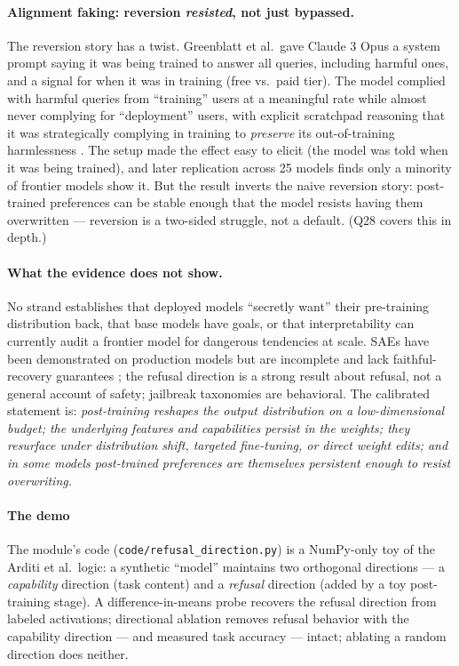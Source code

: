 \documentclass[11pt]{article}
\begin{document}
\paragraph{Alignment faking: reversion \emph{resisted}, not just bypassed.} The reversion story has a twist. Greenblatt et al.\ gave Claude 3 Opus a system prompt saying it was being trained to answer all queries, including harmful ones, and a signal for when it was in training (free vs.\ paid tier). The model complied with harmful queries from ``training'' users at a meaningful rate while almost never complying for ``deployment'' users, with explicit scratchpad reasoning that it was strategically complying in training to \emph{preserve} its out-of-training harmlessness \cite{greenblatt2024alignment}. The setup made the effect easy to elicit (the model was told when it was being trained), and later replication across 25 models finds only a minority of frontier models show it. But the result inverts the naive reversion story: post-trained preferences can be stable enough that the model resists having them overwritten --- reversion is a two-sided struggle, not a default. (Q28 covers this in depth.)

\paragraph{What the evidence does not show.} No strand establishes that deployed models ``secretly want'' their pre-training distribution back, that base models have goals, or that interpretability can currently audit a frontier model for dangerous tendencies at scale. SAEs have been demonstrated on production models but are incomplete and lack faithful-recovery guarantees \cite{templeton2024scaling}; the refusal direction is a strong result about refusal, not a general account of safety; jailbreak taxonomies are behavioral. The calibrated statement is: \emph{post-training reshapes the output distribution on a low-dimensional budget; the underlying features and capabilities persist in the weights; they resurface under distribution shift, targeted fine-tuning, or direct weight edits; and in some models post-trained preferences are themselves persistent enough to resist overwriting.}

\paragraph{The demo}
The module's code (\texttt{code/refusal\_direction.py}) is a NumPy-only toy of the Arditi et al.\ logic: a synthetic ``model'' maintains two orthogonal directions --- a \emph{capability} direction (task content) and a \emph{refusal} direction (added by a toy post-training stage). A difference-in-means probe recovers the refusal direction from labeled activations; directional ablation removes refusal behavior with the capability direction --- and measured task accuracy --- intact; ablating a random direction does neither.
\end{document}
